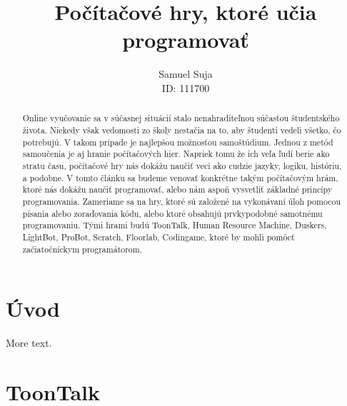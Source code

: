 \documentclass[slovak,a4paper,11pt]{article}
\title{Počítačové hry, ktoré učia programovať }
\author{Samuel Suja \\ ID: 111700}
\begin{document}
\maketitle
\tableofcontents

\begin{abstract}

Online vyučovanie sa v súčasnej situácií stalo nenahraditeľnou súčasťou študentského života. Niekedy však vedomosti zo školy nestačia na to, aby študenti vedeli všetko, čo potrebujú. V takom prípade je najlepšou možnosťou samoštúdium. Jednou z metód samoučenia je aj hranie počítačových hier. Napriek tomu že ich veľa ľudí berie ako stratu času, počítačové hry nás dokážu naučiť veci ako cudzie jazyky, logiku, históriu, a podobne. V tomto článku sa budeme venovať konkrétne takým počítačovým hrám, ktoré nás dokážu naučiť programovať, alebo nám aspoň vysvetliť základné princípy programovania. Zameriame sa na hry, ktoré sú založené na vykonávaní úloh pomocou písania alebo zoraďovania kódu, alebo ktoré obsahujú prvkypodobné samotnému programovaniu. Tými hrami budú ToonTalk, Human Resource Machine, Duskers, LightBot, ProBot, Scratch, Floorlab, Codingame, ktoré by mohli pomôcť začiatočníckym programátorom.

\end{abstract}

\section{Úvod}

More text.

\section{ToonTalk}
\end{document}
